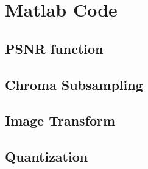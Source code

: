\appendix
\newpage

\section{Matlab Code}
\subsection{PSNR function}
%

\subsection{Chroma Subsampling}
%

\subsection{Image Transform}
%

\subsection{Quantization}
%




